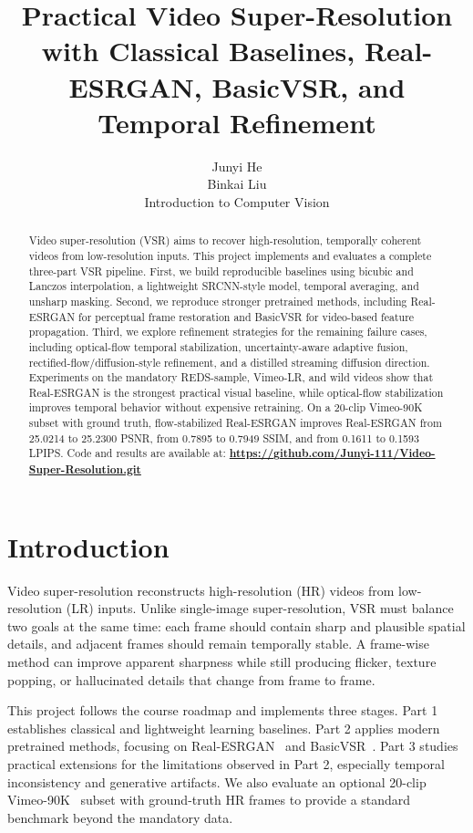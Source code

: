 \documentclass[10pt,twocolumn,letterpaper]{article}
\title{Practical Video Super-Resolution with Classical Baselines, Real-ESRGAN, BasicVSR, and Temporal Refinement}
\author{Junyi He \\
Binkai Liu \\
Introduction to Computer Vision \\
}
\begin{document}
\maketitle

\begin{abstract}
Video super-resolution (VSR) aims to recover high-resolution, temporally coherent videos from low-resolution inputs. This project implements and evaluates a complete three-part VSR pipeline. First, we build reproducible baselines using bicubic and Lanczos interpolation, a lightweight SRCNN-style model, temporal averaging, and unsharp masking. Second, we reproduce stronger pretrained methods, including Real-ESRGAN for perceptual frame restoration and BasicVSR for video-based feature propagation. Third, we explore refinement strategies for the remaining failure cases, including optical-flow temporal stabilization, uncertainty-aware adaptive fusion, rectified-flow/diffusion-style refinement, and a distilled streaming diffusion direction. Experiments on the mandatory REDS-sample, Vimeo-LR, and wild videos show that Real-ESRGAN is the strongest practical visual baseline, while optical-flow stabilization improves temporal behavior without expensive retraining. On a 20-clip Vimeo-90K subset with ground truth, flow-stabilized Real-ESRGAN improves Real-ESRGAN from 25.0214 to 25.2300 PSNR, from 0.7895 to 0.7949 SSIM, and from 0.1611 to 0.1593 LPIPS. Code and results are available at: \textbf{\url{https://github.com/Junyi-111/Video-Super-Resolution.git}}
\end{abstract}

\section{Introduction}

Video super-resolution reconstructs high-resolution (HR) videos from low-resolution (LR) inputs. Unlike single-image super-resolution, VSR must balance two goals at the same time: each frame should contain sharp and plausible spatial details, and adjacent frames should remain temporally stable. A frame-wise method can improve apparent sharpness while still producing flicker, texture popping, or hallucinated details that change from frame to frame.

This project follows the course roadmap and implements three stages. Part 1 establishes classical and lightweight learning baselines. Part 2 applies modern pretrained methods, focusing on Real-ESRGAN~\cite{wang2021realesrgan} and BasicVSR~\cite{chan2021basicvsr}. Part 3 studies practical extensions for the limitations observed in Part 2, especially temporal inconsistency and generative artifacts. We also evaluate an optional 20-clip Vimeo-90K~\cite{xue2019vimeo90k} subset with ground-truth HR frames to provide a standard benchmark beyond the mandatory data.
\end{document}
